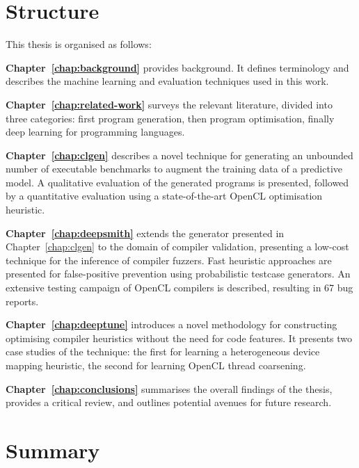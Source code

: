 \newpage
\section{Structure}

This thesis is organised as follows:

\textbf{Chapter~\ref{chap:background}} provides background. It defines terminology and describes the machine learning and evaluation techniques used in this work.

\textbf{Chapter~\ref{chap:related-work}} surveys the relevant literature, divided into three categories: first program generation, then program optimisation, finally deep learning for programming languages.

\textbf{Chapter~\ref{chap:clgen}} describes a novel technique for generating an unbounded number of executable benchmarks to augment the training data of a predictive model. A qualitative evaluation of the generated programs is presented, followed by a quantitative evaluation using a state-of-the-art OpenCL optimisation heuristic.

\textbf{Chapter~\ref{chap:deepsmith}} extends the generator presented in Chapter~\ref{chap:clgen} to the domain of compiler validation, presenting a low-cost technique for the inference of compiler fuzzers. Fast heuristic approaches are presented for false-positive prevention using probabilistic testcase generators. An extensive testing campaign of OpenCL compilers is described, resulting in 67 bug reports.

\textbf{Chapter~\ref{chap:deeptune}} introduces a novel methodology for constructing optimising compiler heuristics without the need for code features. It presents two case studies of the technique: the first for learning a heterogeneous device mapping heuristic, the second for learning OpenCL thread coarsening.

\textbf{Chapter~\ref{chap:conclusions}} summarises the overall findings of the thesis, provides a critical review, and outlines potential avenues for future research.


\section{Summary}

